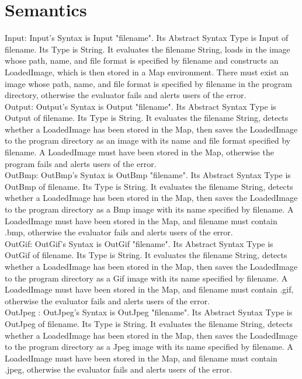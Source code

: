 \documentclass{article}
\begin{document}
\section{Semantics}

Input: Input's Syntax is Input "filename". Its Abstract Syntax Type is Input of filename. Its Type is String. It evaluates the filename String, loads in the image whose path, name, and file format is specified by filename and constructs an LoadedImage, which is then stored in a Map environment. There must exist an image whose path, name, and file format is specified by filename in the program directory, otherwise the evaluator fails and alerts users of the error.
\\Output: Output's Syntax is Output "filename". Its Abstract Syntax Type is Output of filename. Its Type is String. It evaluates the filename String, detects whether a LoadedImage has been stored in the Map, then saves the LoadedImage to the program directory as an image with its name and file format specified by filename. A LoadedImage must have been stored in the Map, otherwise the program fails and alerts users of the error.
\\OutBmp: OutBmp's Syntax is OutBmp "filename". Its Abstract Syntax Type is OutBmp of filename. Its Type is String. It evaluates the filename String, detects whether a LoadedImage has been stored in the Map, then saves the LoadedImage to the program directory as a Bmp image with its name specified by filename. A LoadedImage must have been stored in the Map, and filename must contain .bmp, otherwise the evaluator fails and alerts users of the error.
\\OutGif: OutGif's Syntax is OutGif "filename". Its Abstract Syntax Type is OutGif of filename. Its Type is String. It evaluates the filename String, detects whether a LoadedImage has been stored in the Map, then saves the LoadedImage to the program directory as a Gif image with its name specified by filename. A LoadedImage must have been stored in the Map, and filename must contain .gif, otherwise the evaluator fails and alerts users of the error.
\\OutJpeg : OutJpeg's Syntax is OutJpeg "filename". Its Abstract Syntax Type is OutJpeg of filename. Its Type is String. It evaluates the filename String, detects whether a LoadedImage has been stored in the Map, then saves the LoadedImage to the program directory as a Jpeg image with its name specified by filename. A LoadedImage must have been stored in the Map, and filename must contain .jpeg, otherwise the evaluator fails and alerts users of the error.
\end{document}
